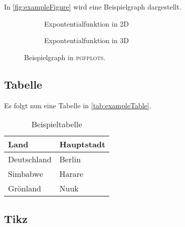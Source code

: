 In \autoref{fig:exampleFigure} wird eine Beispielgraph dargestellt.
\lipsum[4]

\begin{figure}[ht]
    \centering
    \begin{subfigure}{0.45\textwidth}
        \caption{Expontentialfunktion in 2D}
        \label{fig:2d-exp}
    \end{subfigure}
    \begin{subfigure}{0.45\textwidth}
        \caption{Expontentialfunktion in 3D}
        \label{fig:3d-exp}
    \end{subfigure}
    \caption[Beispielgraph]{Beispielgraph in \textsc{pgfplots}.}
    \label{fig:exampleFigure}
\end{figure}

\subsection{Tabelle}

Es folgt nun eine Tabelle in \autoref{tab:exampleTable}.
\lipsum[5]

\begin{table}[ht]
    \centering
    \begin{tabular}{|l|l|}
        \hline
        \textbf
        Land & Hauptstadt
        \normalfont \\
        \hline
        \hline
        Deutschland & Berlin\\
        \hline
        Simbabwe & Harare\\
        \hline
        Grönland & Nuuk\\
        \hline
    \end{tabular}
    \caption{Beispieltabelle}
    \label{tab:exampleTable}
\end{table}

\subsection{Tikz}

